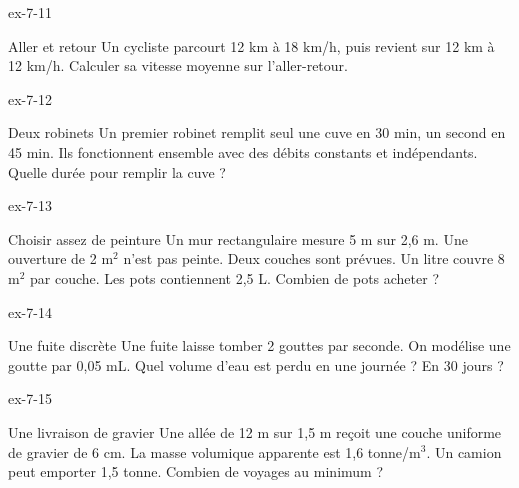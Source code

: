 \clearpage{}
\begin{blocLivre}{ex-7-11}\begin{exercice}[3]{Aller et retour}
Un cycliste parcourt 12 km à 18 km/h, puis revient sur 12 km à 12 km/h. Calculer sa vitesse moyenne sur l’aller-retour.
\end{exercice}\end{blocLivre}
\begin{blocLivre}{ex-7-12}\begin{exercice}[3]{Deux robinets}
Un premier robinet remplit seul une cuve en 30 min, un second en 45 min. Ils fonctionnent ensemble avec des débits constants et indépendants. Quelle durée pour remplir la cuve ?
\end{exercice}\end{blocLivre}
\begin{blocLivre}{ex-7-13}\begin{exercice}[3]{Choisir assez de peinture}
Un mur rectangulaire mesure 5 m sur 2,6 m. Une ouverture de 2 m$^2$ n’est pas peinte. Deux couches sont prévues. Un litre couvre 8 m$^2$ par couche. Les pots contiennent 2,5 L. Combien de pots acheter ?
\end{exercice}\end{blocLivre}
\begin{blocLivre}{ex-7-14}\begin{exercice}[3]{Une fuite discrète}
Une fuite laisse tomber 2 gouttes par seconde. On modélise une goutte par 0,05 mL. Quel volume d’eau est perdu en une journée ? En 30 jours ?
\end{exercice}\end{blocLivre}
\begin{blocLivre}{ex-7-15}\begin{exercice}[3]{Une livraison de gravier}
Une allée de 12 m sur 1,5 m reçoit une couche uniforme de gravier de 6 cm. La masse volumique apparente est 1,6 tonne/m$^3$. Un camion peut emporter 1,5 tonne. Combien de voyages au minimum ?
\end{exercice}\end{blocLivre}

\clearpage
